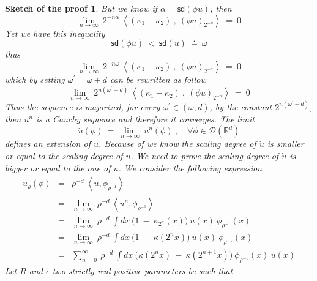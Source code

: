 \documentclass[11pt]{book}
\newcommand{\sd}{\mathsf{sd}}
\newcommand{\sm}[1]{\left\langle#1\right\rangle}
\newcommand{\Dcal}{\mathcal{D}}
\newcommand{\Rbb}{\mathbb{R}}
\theoremstyle{break}
\newtheorem{sketch}{Sketch of the proof}[chapter]
\begin{document}
\begin{sketch}
 But we know if $\alpha = \sd(\phi u)$, then 
 \begin{equation*}
  \lim_{n \to \infty} \ 2^{-n\alpha} \ \sm{\left(\kappa_1 - \kappa_2\right) \ , \ (\phi u)_{2^{-n}}} \ = \ 0
 \end{equation*}
 Yet we have this inequality
 \begin{equation*}
  \sd(\phi u) \ < \ \sd(u) \ \doteq \ \omega \label{eq:inequality-sd}
 \end{equation*}
 thus
 \begin{equation*}
  \lim_{n \to \infty} \ 2^{-n\omega} \ \sm{\left(\kappa_1 - \kappa_2\right) \ , \ (\phi u)_{2^{-n}}} \ = \ 0
 \end{equation*}
 which by setting $\omega^\prime = \omega + d$ can be rewritten as follow
 \begin{equation*}
  \lim_{n \to \infty} \ 2^{n(\omega^\prime-d)} \ \sm{\left(\kappa_1 - \kappa_2\right) \ , \ (\phi u)_{2^{-n}}} \ = \ 0  
 \end{equation*}
 Thus the sequence is majorized, for every $\omega^\prime \in (\omega,d)$, by the constant $2^{n(\omega^\prime-d)}$, then $u^n$ is a Cauchy sequence and therefore it converges. The limit
 \begin{equation*}
  \dot{u}(\phi) \ = \ \lim_{n\to \infty} \ u^n(\phi) \ ,  \quad \forall \phi \in \Dcal(\Rbb^d)
 \end{equation*}
 defines an extension of $u$. Because of %
 we know the scaling degree of $\dot{u}$ is smaller or equal to the scaling degree of $u$. We need to prove the scaling degree of $\dot{u}$ is bigger or equal to the one of $u$. We consider the following expression
 \begin{eqnarray*}
  u_\rho(\phi) &=& \rho^{-d} \ \sm{\dot{u} , \phi_{\rho^{-1}}} \\
  &=& \lim_{n \to \infty} \ \rho^{-d} \ \sm{u^n , \phi_{\rho^{-1}}} \\
  &=& \lim_{n \to \infty} \ \rho^{-d} \ \int dx \ \bigg( 1 \ - \ \kappa_{2^n}(x) \bigg) \ u(x) \ \phi_{\rho^{-1}}(x) \\
  &=& \lim_{n \to \infty} \ \rho^{-d} \ \int dx \ \bigg( 1 \ - \ \kappa(2^n x) \bigg) \ u(x) \ \phi_{\rho^{-1}}(x) \\
  &=& \sum_{n=0}^{\infty} \ \rho^{-d} \ \int dx \ \bigg( \kappa(2^n x) \ - \ \kappa(2^{n+1} x) \bigg) \ \phi_{\rho^{-1}}(x) \ u(x) 
 \end{eqnarray*}
 Let $R$ and $\epsilon$ two strictly real positive parameters be such that 
 \begin{eqnarray*}

\end{eqnarray*}
\end{sketch}
\end{document}
